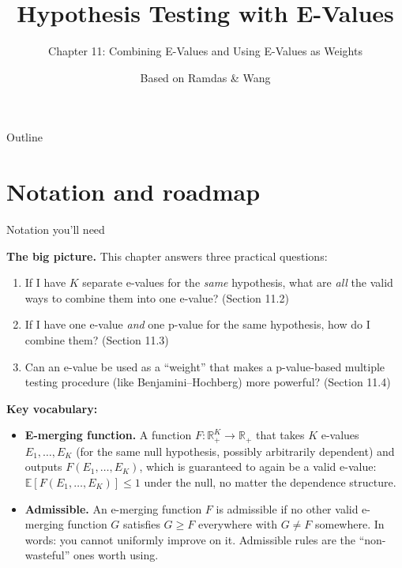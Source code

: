 \documentclass[aspectratio=169,10pt]{beamer}
\title[E-Values -- Ch.11]{Hypothesis Testing with E-Values}
\subtitle{Chapter 11: Combining E-Values and Using E-Values as Weights}
\author{Based on Ramdas \& Wang}
\date{}
\newcommand{\EE}{\mathbb{E}}
\newcommand{\RR}{\mathbb{R}}
\newcommand{\1}{\mathbb{1}}
\begin{document}
\begin{frame}
\titlepage
\end{frame}

\begin{frame}[allowframebreaks]{Outline}
\tableofcontents
\end{frame}

\section{Notation and roadmap}

\begin{frame}[allowframebreaks]{Notation you'll need}

\textbf{The big picture.} This chapter answers three practical questions:
\begin{enumerate}
\item If I have $K$ separate e-values for the \emph{same} hypothesis, what are \emph{all} the valid ways to combine them into one e-value? (Section 11.2)
\item If I have one e-value \emph{and} one p-value for the same hypothesis, how do I combine them? (Section 11.3)
\item Can an e-value be used as a ``weight'' that makes a p-value-based multiple testing procedure (like Benjamini--Hochberg) more powerful? (Section 11.4)
\end{enumerate}

\vspace{2mm}
\textbf{Key vocabulary:}

\begin{itemize}
\item \textbf{E-merging function.} A function $F:\RR_+^K \to \RR_+$ that takes $K$ e-values $E_1,\dots,E_K$ (for the same null hypothesis, possibly arbitrarily dependent) and outputs $F(E_1,\dots,E_K)$, which is guaranteed to again be a valid e-value: $\EE[F(E_1,\dots,E_K)] \le 1$ under the null, no matter the dependence structure.

\item \textbf{Admissible.} An e-merging function $F$ is admissible if no other valid e-merging function $G$ satisfies $G \ge F$ everywhere with $G \ne F$ somewhere. In words: you cannot uniformly improve on it. Admissible rules are the ``non-wasteful'' ones worth using.


\end{itemize}
\end{frame}
\end{document}
